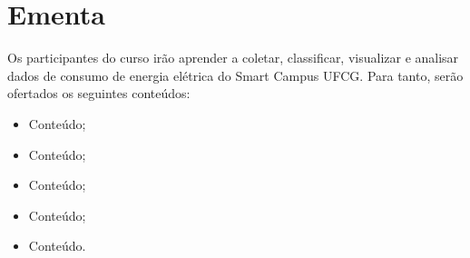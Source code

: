 \section{Ementa}
Os participantes do curso irão aprender a coletar, classificar, visualizar e analisar dados de consumo de energia elétrica do Smart Campus UFCG. Para tanto, serão ofertados os seguintes conteúdos:

\begin{itemize}
	\item Conteúdo;
	\item Conteúdo;
	\item Conteúdo;
	\item Conteúdo;
	\item Conteúdo.
\end{itemize}
